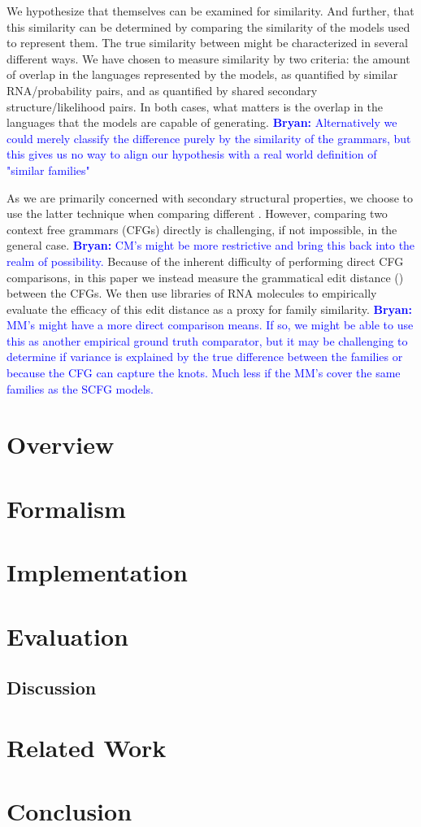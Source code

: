 \documentclass[10pt,conference,peerreview]{IEEEtran}
\newcommand{\br}[1]{\textcolor{blue}{\textbf{Bryan:} #1}}
\begin{document}
We hypothesize that \rnaf{} themselves can be examined for similarity.  
And further, that this similarity can be determined by comparing the similarity of the models used to represent them.  
The true similarity between \rnaf{} might be characterized in several different ways.  
We have chosen to measure similarity by two criteria: the amount of overlap in the languages represented by the models, as quantified by similar RNA/probability pairs, and as quantified by shared secondary structure/likelihood pairs.  
In both cases, what matters is the overlap in the languages that the models are capable of generating. \br{Alternatively we could merely classify the difference purely by the similarity of the grammars, but this gives us no way to align our hypothesis with a real world definition of "similar families"}

As we are primarily concerned with secondary structural properties, we choose to use the latter technique when comparing different \rnaf{}.  
However, comparing two context free grammars (CFGs) directly is challenging, if not impossible, in the general case.  
\br{CM's might be more restrictive and bring this back into the realm of possibility.}
Because of the inherent difficulty of performing direct CFG comparisons, in this paper we instead measure the grammatical edit distance \ged{} (\gedabbv) between the CFGs.  
We then use libraries of RNA molecules to empirically evaluate the efficacy of this edit distance as a proxy for family similarity.  
\br{MM's might have a more direct comparison means. If so, we might be able to use this as another empirical ground truth comparator, but it may be challenging to determine if variance is explained by the true difference between the families or because the CFG can capture the knots. Much less if the MM's cover the same families as the SCFG models.}

\section{Overview}
\label{sec:overview}



\section{Formalism}
\label{sec:formalism}


\section{Implementation}
\label{sec:implementation}


\section{Evaluation}
\label{sec:evaluation}


\subsection{Discussion}


\section{Related Work}
\label{sec:related-work}


\section{Conclusion}
\label{sec:conlusion}


\printbibliography
\end{document}
